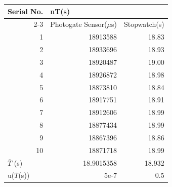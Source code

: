 \documentclass{report}
\begin{document}
\begin{table}[H]
\centering
\begin{tabular}{|r|rr|}
\hline
\multicolumn{1}{|l|}{\multirow{2}{*}{Serial No.}}         & \multicolumn{2}{l|}{nT(s)}                                                           \\ \cline{2-3} 
\multicolumn{1}{|l|}{}                                    & \multicolumn{1}{l|}{Photogate Sensor(\(\mu \)s)} & \multicolumn{1}{l|}{Stopwatch(s)} \\ \hline
1                                                         & \multicolumn{1}{r|}{18913588}                    & 18.83                             \\ \hline
2                                                         & \multicolumn{1}{r|}{18933696}                    & 18.93                             \\ \hline
3                                                         & \multicolumn{1}{r|}{18920487}                    & 19.00                             \\ \hline
4                                                         & \multicolumn{1}{r|}{18926872}                    & 18.98                             \\ \hline
5                                                         & \multicolumn{1}{r|}{18873810}                    & 18.84                             \\ \hline
6                                                         & \multicolumn{1}{r|}{18917751}                    & 18.91                             \\ \hline
7                                                         & \multicolumn{1}{r|}{18912606}                    & 18.99                             \\ \hline
8                                                         & \multicolumn{1}{r|}{18877434}                    & 18.99                             \\ \hline
9                                                         & \multicolumn{1}{r|}{18867396}                    & 18.86                             \\ \hline
10                                                        & \multicolumn{1}{r|}{18871718}                    & 18.99                             \\ \hline
\multicolumn{1}{|l|}{{}\(\overline{T}\) (s)}        & \multicolumn{1}{r|}{18.9015358}                  & 18.932                            \\ \hline
\multicolumn{1}{|l|}{u({}\(\overline{T}\)(s))} & \multicolumn{1}{r|}{5e-7}                        & 0.5                               \\ \hline
\end{tabular}
\end{table}
\end{document}
